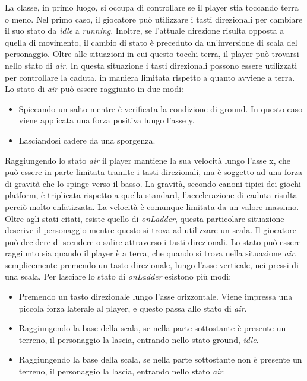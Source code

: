 La classe, in primo luogo, si occupa di controllare se il player stia toccando terra o meno. Nel primo caso, il giocatore può utilizzare i tasti direzionali per cambiare il suo stato da \textit{idle} a \textit{running}. Inoltre, se l’attuale direzione risulta opposta a quella di movimento, il cambio di stato è preceduto da un’inversione di scala del personaggio.
Oltre alle situazioni in cui questo tocchi terra, il player può trovarsi nello stato di \textit{air}. In questa situazione i tasti direzionali possono essere utilizzati per controllare la caduta, in maniera limitata rispetto a quanto avviene a terra.
Lo stato di \textit{air} può essere raggiunto in due modi:

\begin{itemize}
	\item Spiccando un salto mentre è verificata la condizione di ground. In questo caso viene applicata una forza positiva lungo l’asse y.	
	\item Lasciandosi cadere da una sporgenza.
\end{itemize}

Raggiungendo lo stato \textit{air} il player mantiene la sua velocità lungo l’asse x, che può essere in parte limitata tramite i tasti direzionali, ma è soggetto ad una forza di gravità che lo spinge verso il basso.
La gravità, secondo canoni tipici dei giochi platform, è triplicata rispetto a quella standard, l’accelerazione di caduta risulta perciò molto enfatizzata. La velocità è comunque limitata da un valore massimo.
Oltre agli stati citati, esiste quello di \textit{onLadder}, questa particolare situazione descrive il personaggio mentre questo si trova ad utilizzare un scala. Il giocatore può decidere di scendere o salire attraverso i tasti direzionali. Lo stato può essere raggiunto sia quando il player è a terra, che quando si trova nella situazione \textit{air}, semplicemente premendo un tasto direzionale, lungo l’asse verticale, nei pressi di una scala.
Per lasciare lo stato di \textit{onLadder} esistono più modi:

\begin{itemize}
	\item Premendo un tasto direzionale lungo l’asse orizzontale. Viene impressa una piccola forza laterale al player, e questo passa allo stato di \textit{air}.	
	\item Raggiungendo la base della scala, se nella parte sottostante è presente un terreno, il personaggio la lascia, entrando nello stato ground, \textit{idle}.
	\item Raggiungendo la base della scala, se nella parte sottostante non è presente un terreno, il personaggio la lascia, entrando nello stato \textit{air}.
\end{itemize}

